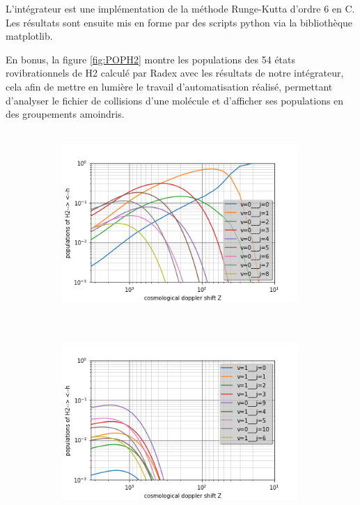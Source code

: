 \documentclass[10pt, a4paper]{report}
\numberwithin{equation}{subsection}
\begin{document}
L'intégrateur est une implémentation de la méthode Runge-Kutta d'ordre 6 en C. Les résultats sont ensuite mis en forme par des scripts python via la bibliothèque matplotlib.

En bonus, la figure \ref{fig:POPH2} montre les populations des 54 états rovibrationnels de H2 calculé par Radex avec les résultats de notre intégrateur, cela afin de mettre en lumière le travail d'automatisation réalisé, permettant d'analyser le fichier de collisions d'une molécule et d'afficher ses populations en des groupements amoindris.

\begin{figure}[]

\begin{subfigure}{0.5\textwidth}
\centering
\includegraphics[width=9cm,height=7cm]{levelsh2-h.0.png}
\end{subfigure}
\begin{subfigure}{0.5\textwidth}
\centering
\includegraphics[width=9cm,height=7cm]{levelsh2-h.1.png}
\end{subfigure}
\begin{subfigure}{0.5\textwidth}

\end{subfigure}
\end{figure}
\end{document}
